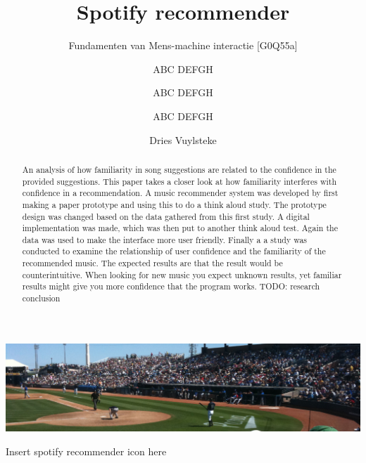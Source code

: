 \documentclass[sigconf,nonacm]{acmart}
\begin{document}
\title{Spotify recommender}
\subtitle{Fundamenten van Mens-machine interactie [G0Q55a]}

\author{ABC DEFGH}

\author{ABC DEFGH}

\author{ABC DEFGH}

\author{Dries Vuylsteke}

\renewcommand{\shortauthors}{Group X}

\begin{abstract}
  An analysis of how familiarity in song suggestions are related to the confidence in the provided suggestions. This paper takes a closer look at how familiarity interferes with confidence in a recommendation. A music recommender system was developed by first making a paper prototype and using this to do a think aloud study. The prototype design was changed based on the data gathered from this first study. A digital implementation was made, which was then put to another think aloud test. Again the data was used to make the interface more user friendly.
  Finally a a study was conducted to examine the relationship of user confidence and the familiarity of the recommended music. The expected results are that the result would be counterintuitive. When looking for new music you expect unknown results, yet familiar results might give you more confidence that the program works.
  TODO: research conclusion
\end{abstract}


\begin{teaserfigure}
  \includegraphics[width=\textwidth]{sampleteaser}
  \caption{Insert spotify recommender icon here}
  \label{fig:teaser}
\end{teaserfigure}

\maketitle
\end{document}
